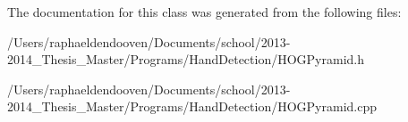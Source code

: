 The documentation for this class was generated from the following files\-:\begin{DoxyCompactItemize}
\item 
/\-Users/raphaeldendooven/\-Documents/school/2013-\/2014\-\_\-\-Thesis\-\_\-\-Master/\-Programs/\-Hand\-Detection/H\-O\-G\-Pyramid.\-h\item 
/\-Users/raphaeldendooven/\-Documents/school/2013-\/2014\-\_\-\-Thesis\-\_\-\-Master/\-Programs/\-Hand\-Detection/H\-O\-G\-Pyramid.\-cpp\end{DoxyCompactItemize}
